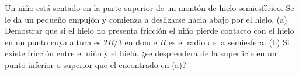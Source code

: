 \documentclass[../main.tex]{subfiles}
\begin{document}
\begin{problema}
	Un niño está sentado en la parte superior de un montón
	de hielo semiesférico. Se le da un pequeño empujón y
	comienza a deslizarse hacia abajo por el hielo.
	(a) Demostrar que si el hielo no presenta fricción
	el niño pierde contacto con el hielo en un punto
	cuya altura es \(2R/3\) en donde \(R\) es el radio
	de la semiesfera.
	(b) Si existe fricción entre el niño y el hielo,
	¿se desprenderá de la superficie en un punto inferior
	o superior que el encontrado en (a)?
\end{problema}
\end{document}
